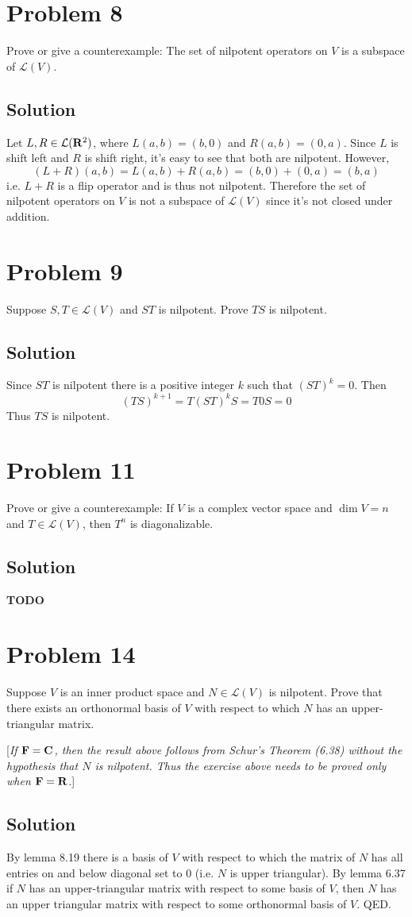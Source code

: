 \documentclass{article}
\begin{document}
\section*{Problem 8}
Prove or give a counterexample: The set of nilpotent operators on $V$ is a subspace of $\mathcal{L}(V)$.

\subsection*{Solution}
Let $L,R\in\mathcal{L}(\mathbf{R}^2)$, where $L(a, b)=(b,0)$ and $R(a,b)=(0,a)$. Since $L$ is shift left and $R$ is shift right, it's easy to see that both are nilpotent. However,
\[(L+R)(a,b)=L(a,b)+R(a,b)=(b,0)+(0, a)=(b,a)\]
i.e. $L+R$ is a flip operator and is thus not nilpotent. Therefore the set of nilpotent operators on $V$ is not a subspace of $\mathcal{L}(V)$ since it's not closed under addition.

\section*{Problem 9}
Suppose $S, T\in\mathcal{L}(V)$ and $ST$ is nilpotent. Prove $TS$ is nilpotent.

\subsection*{Solution}
Since $ST$ is nilpotent there is a positive integer $k$ such that $(ST)^k=0$. Then
\[(TS)^{k+1}=T(ST)^k S=T0S=0\]
Thus $TS$ is nilpotent.

\section*{Problem 11}
Prove or give a counterexample: If $V$ is a complex vector space and $\dim V=n$ and $T\in\mathcal{L}(V)$, then $T^n$ is diagonalizable.

\subsection*{Solution}
\textbf{TODO}

\section*{Problem 14}
Suppose $V$ is an inner product space and $N\in\mathcal{L}(V)$ is nilpotent. Prove that there exists an orthonormal basis of $V$ with respect to which $N$ has an upper-triangular matrix.

[\textit{If $\mathbf{F}=\mathbf{C}$, then the result above follows from Schur's Theorem (6.38) without the hypothesis that $N$ is nilpotent. Thus the exercise above needs to be proved only when $\mathbf{F}=\mathbf{R}$}.]

\subsection*{Solution}
By lemma 8.19 there is a basis of $V$ with respect to which the matrix of $N$ has all entries on and below diagonal set to $0$ (i.e. $N$ is upper triangular). By lemma 6.37 if $N$ has an upper-triangular matrix with respect to some basis of $V$, then $N$ has an upper triangular matrix with respect to some orthonormal basis of $V$. QED.
\end{document}
